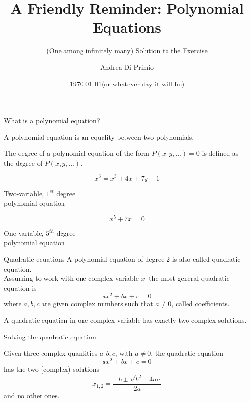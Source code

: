 \documentclass[10pt]{beamer}
\title{A Friendly Reminder: Polynomial Equations}
\subtitle{(One among infinitely many) Solution to the Exercise}
\author{Andrea Di Primio}
\date{\today \:(or whatever day it will be)}
\begin{document}
\begin{frame}[plain]
	\maketitle
\end{frame}

\begin{frame}{What is a polynomial equation?}

\begin{definition}
	A polynomial equation is an equality between two polynomials. 	
\end{definition}
\begin{definition}
	The degree of a polynomial equation of the form $P(x,y,...) = 0$ is defined as the degree of $P(x,y,...)$.
\end{definition}
\vspace{2\baselineskip}
\begin{minipage}{0.48\linewidth}
	\[ x^3 = x^3 + 4x + 7y - 1 \]
\begin{center}
	Two-variable, $1^{st}$ degree\\ polynomial equation
\end{center}
\end{minipage}
\begin{minipage}{0.48\linewidth}
	\[ x^5 + 7x = 0 \]
\begin{center}
	One-variable, $5^{th}$ degree\\ polynomial equation
\end{center}
\end{minipage}
\end{frame}

\begin{frame}{Quadratic equations}
A polynomial equation of degree 2 is also called quadratic equation.\\[\baselineskip]
Assuming to work with one complex variable $x$, the most general quadratic equation is
\[ ax^2 + bx + c = 0 \]
where $a, b, c$ are given complex numbers such that $a \neq 0$, called coefficients.\\[\baselineskip]
\begin{theorem}
	A quadratic equation in one complex variable has exactly two complex solutions.
\end{theorem}
\end{frame}

\begin{frame}{Solving the quadratic equation}
\begin{theorem}
	Given three complex quantities $a,b,c$, with $a \neq 0$, the quadratic equation
	\[ ax^2 + bx + c = 0 \]
	has the two (complex) solutions
	\[ x_{1,2} = \dfrac{-b \pm \sqrt{b^2 - 4ac}}{2a} \]
	and no other ones.
\end{theorem}
\end{frame}
\end{document}

